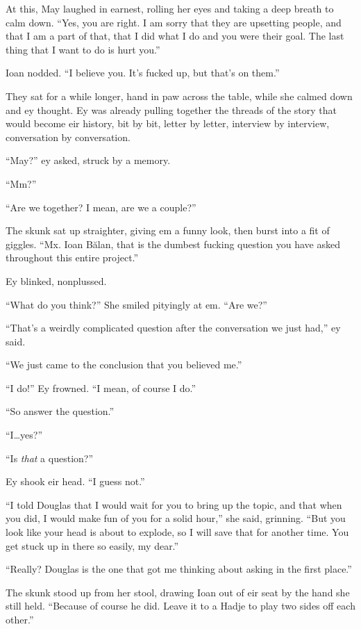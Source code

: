 At this, May laughed in earnest, rolling her eyes and taking a deep breath to calm down. ``Yes, you are right. I am sorry that they are upsetting people, and that I am a part of that, that I did what I do and you were their goal. The last thing that I want to do is hurt you.''

Ioan nodded. ``I believe you. It's fucked up, but that's on them.''

They sat for a while longer, hand in paw across the table, while she calmed down and ey thought. Ey was already pulling together the threads of the story that would become eir history, bit by bit, letter by letter, interview by interview, conversation by conversation.

``May?'' ey asked, struck by a memory.

``Mm?''

``Are we together? I mean, are we a couple?''

The skunk sat up straighter, giving em a funny look, then burst into a fit of giggles. ``Mx. Ioan Bălan, that is the dumbest fucking question you have asked throughout this entire project.''

Ey blinked, nonplussed.

``What do you think?'' She smiled pityingly at em. ``Are we?''

``That's a weirdly complicated question after the conversation we just had,'' ey said.

``We just came to the conclusion that you believed me.''

``I do!'' Ey frowned. ``I mean, of course I do.''

``So answer the question.''

``I\ldots yes?''

``Is \emph{that} a question?''

Ey shook eir head. ``I guess not.''

``I told Douglas that I would wait for you to bring up the topic, and that when you did, I would make fun of you for a solid hour,'' she said, grinning. ``But you look like your head is about to explode, so I will save that for another time. You get stuck up in there so easily, my dear.''

``Really? Douglas is the one that got me thinking about asking in the first place.''

The skunk stood up from her stool, drawing Ioan out of eir seat by the hand she still held. ``Because of course he did. Leave it to a Hadje to play two sides off each other.''

